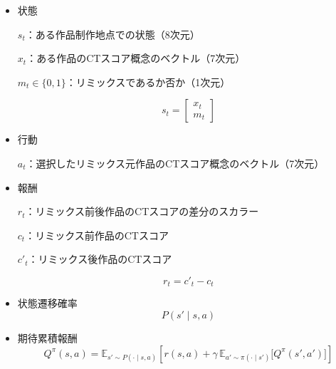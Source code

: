 \documentclass[submit,techrep,noauthor]{ipsj}
\begin{document}
\begin{itemize}
  \item 状態
    
    $s_t$：ある作品制作地点での状態（8次元）

    $x_t$：ある作品のCTスコア概念のベクトル（7次元）

    $m_t\in\{0,1\}$：リミックスであるか否か（1次元）

    \begin{equation}
        s_t = 
        \begin{bmatrix}
           x_t \\
           m_t 
        \end{bmatrix}
    \end{equation}

  \item 行動

    $a_t$：選択したリミックス元作品のCTスコア概念のベクトル（7次元）

  
  \item 報酬

    $r_t$：リミックス前後作品のCTスコアの差分のスカラー
    
    $c_t$：リミックス前作品のCTスコア

    $c'_t$：リミックス後作品のCTスコア
    
    \begin{equation}
        r_t = c'_t - c_t
    \end{equation}

    

    
  
  \item 状態遷移確率
\begin{equation}
    P(s' \mid s, a)
\end{equation}
  \item 期待累積報酬
\begin{equation}
    Q^{\pi}(s, a) = \mathbb{E}_{s' \sim P(\cdot \mid s, a)} 
    \left[ r(s, a) + \gamma \, 
    \mathbb{E}_{a' \sim \pi(\cdot \mid s')} 
    \big[ Q^{\pi}(s', a') \big] \right]
\end{equation}

\end{itemize}
\end{document}
